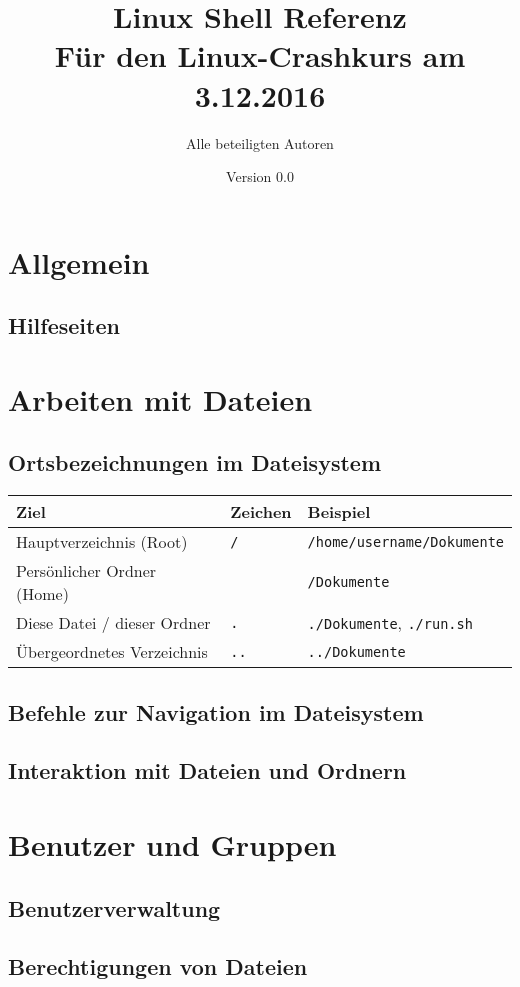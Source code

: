 \documentclass[11pt]{article}
\title{\textbf{Linux Shell Referenz}\\Für den Linux-Crashkurs am 3.12.2016}
\author{Alle beteiligten Autoren}
\date{Version 0.0}
\newcommand{\textapprox}{\raisebox{0.5ex}{\texttildelow}}
\begin{document}
\maketitle

\section {Allgemein}

\subsection {Hilfeseiten}

\section {Arbeiten mit Dateien}

\subsection {Ortsbezeichnungen im Dateisystem}

\begin{tabularx}{1\textwidth}{|l|l|X|}
\hline
\textbf{Ziel} & \textbf{Zeichen} & \textbf{Beispiel} \\
\hline
Hauptverzeichnis (Root) & \lstinline$/$ & \lstinline$/home/username/Dokumente$ \\
Persönlicher Ordner (Home) & \textapprox & \textapprox\lstinline$/Dokumente$ \\
Diese Datei / dieser Ordner & \lstinline$.$ & \lstinline$./Dokumente$, \lstinline$./run.sh$ \\
Übergeordnetes Verzeichnis & \lstinline$..$ & \lstinline$../Dokumente$ \\
\hline
\end{tabularx}

\subsection {Befehle zur Navigation im Dateisystem}

\subsection {Interaktion mit Dateien und Ordnern}

\section {Benutzer und Gruppen}

\subsection {Benutzerverwaltung}

\subsection {Berechtigungen von Dateien}



\end{document}
